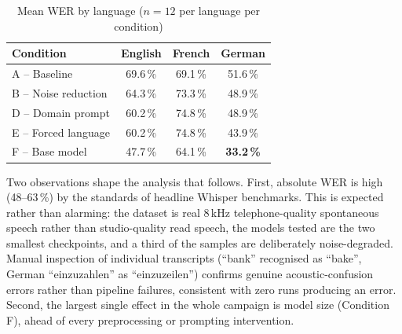 \documentclass[12pt]{report}
\begin{document}
\begin{table}[H]
\centering
\begin{tabular}{|l|c|c|c|}
\hline
\textbf{Condition} & \textbf{English} & \textbf{French} & \textbf{German} \\ \hline
A -- Baseline & 69.6\,\% & 69.1\,\% & 51.6\,\% \\ \hline
B -- Noise reduction & 64.3\,\% & 73.3\,\% & 48.9\,\% \\ \hline
D -- Domain prompt & 60.2\,\% & 74.8\,\% & 48.9\,\% \\ \hline
E -- Forced language & 60.2\,\% & 74.8\,\% & 43.9\,\% \\ \hline
F -- Base model & 47.7\,\% & 64.1\,\% & \textbf{33.2\,\%} \\ \hline
\end{tabular}
\caption{Mean WER by language ($n=12$ per language per condition)}
\label{tab:results_lang}
\end{table}
Two observations shape the analysis that follows. First, absolute WER is high (48--63\,\%) by the standards of headline Whisper benchmarks. This is expected rather than alarming: the dataset is real 8\,kHz telephone-quality spontaneous speech rather than studio-quality read speech, the models tested are the two smallest checkpoints, and a third of the samples are deliberately noise-degraded. Manual inspection of individual transcripts (\enquote{bank} recognised as \enquote{bake}, German \enquote{einzuzahlen} as \enquote{einzuzeilen}) confirms genuine acoustic-confusion errors rather than pipeline failures, consistent with zero runs producing an error. Second, the largest single effect in the whole campaign is model size (Condition F), ahead of every preprocessing or prompting intervention.
\end{document}
